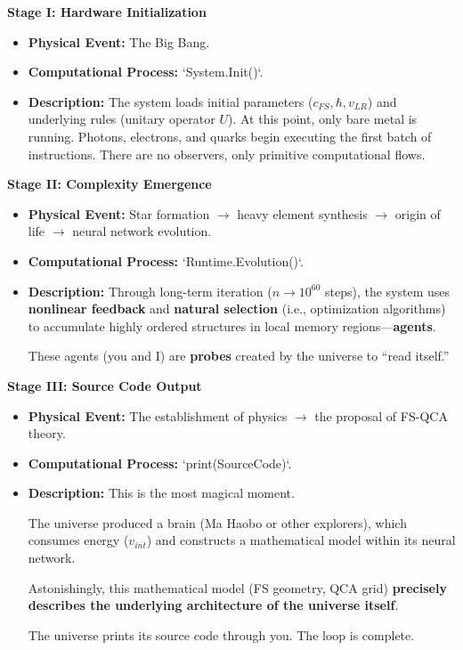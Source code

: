 \documentclass[11pt,a4paper,twoside]{book}
\begin{document}
\textbf{Stage I: Hardware Initialization}

\begin{itemize}
\item \textbf{Physical Event:} The Big Bang.

\item \textbf{Computational Process:} `System.Init()`.

\item \textbf{Description:} The system loads initial parameters (\textbf{$c_{FS}, \hbar, v_{LR}$}) and underlying rules (unitary operator \textbf{$U$}). At this point, only bare metal is running. Photons, electrons, and quarks begin executing the first batch of instructions. There are no observers, only primitive computational flows.
\end{itemize}

\textbf{Stage II: Complexity Emergence}

\begin{itemize}
\item \textbf{Physical Event:} Star formation $\to$ heavy element synthesis $\to$ origin of life $\to$ neural network evolution.

\item \textbf{Computational Process:} `Runtime.Evolution()`.

\item \textbf{Description:} Through long-term iteration (\textbf{$n \to 10^{60}$} steps), the system uses \textbf{nonlinear feedback} and \textbf{natural selection} (i.e., optimization algorithms) to accumulate highly ordered structures in local memory regions---\textbf{agents}.

    These agents (you and I) are \textbf{probes} created by the universe to ``read itself.''
\end{itemize}

\textbf{Stage III: Source Code Output}

\begin{itemize}
\item \textbf{Physical Event:} The establishment of physics $\to$ the proposal of FS-QCA theory.

\item \textbf{Computational Process:} `print(SourceCode)`.

\item \textbf{Description:} This is the most magical moment.

    The universe produced a brain (Ma Haobo or other explorers), which consumes energy (\textbf{$v_{int}$}) and constructs a mathematical model within its neural network.

    Astonishingly, this mathematical model (FS geometry, QCA grid) \textbf{precisely describes the underlying architecture of the universe itself}.

    The universe prints its source code through you. The loop is complete.
\end{itemize}
\end{document}
